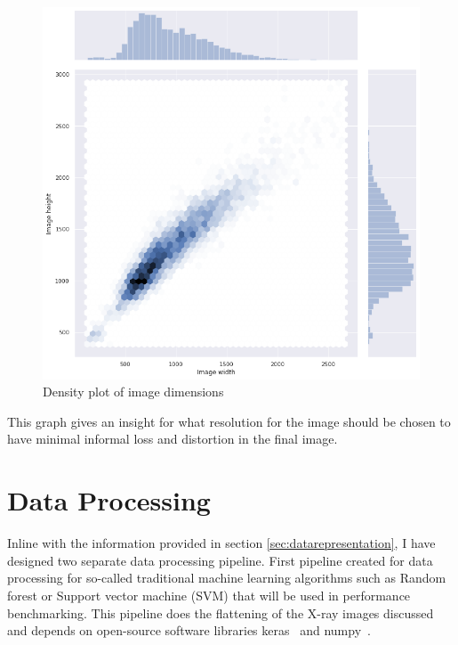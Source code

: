 \begin{figure}[H]
    \centering
    \includegraphics[width=\textwidth]{img/image_dims_density.png}
    \caption{Density plot of image dimensions}
    \label{fig:imagedimensions}
\end{figure}

This graph gives an insight for what resolution for the image should be chosen to have minimal informal loss and distortion in the final image.

\section{Data Processing} \label{sec:dataprocessing}
Inline with the information provided in section \ref{sec:datarepresentation}, I have designed two separate data processing pipeline.
First pipeline created for data processing for so-called traditional machine learning algorithms such as Random forest or Support vector machine (SVM) that will be used in performance benchmarking.
This pipeline does the flattening of the X-ray images discussed and depends on open-source software libraries keras~\cite{keras} and numpy~\cite{numpy}.

